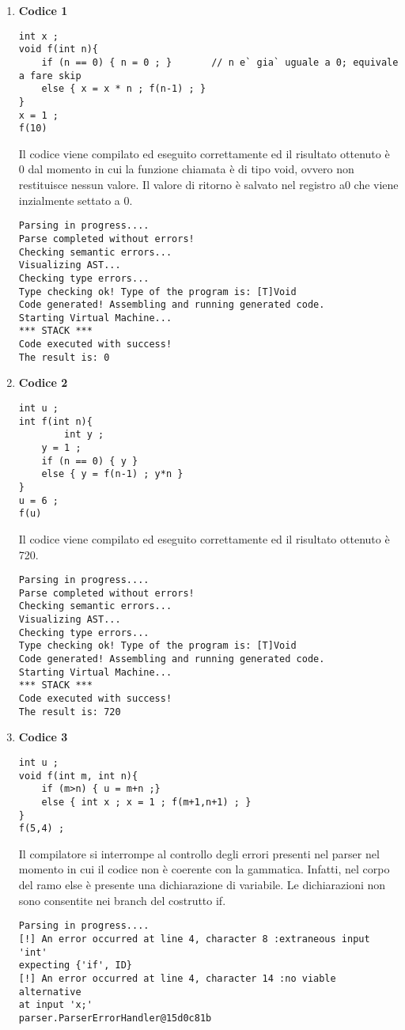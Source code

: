 \begin{enumerate}
\item \textbf{Codice 1}
\begin{verbatim}
int x ;
void f(int n){
	if (n == 0) { n = 0 ; }       // n e` gia` uguale a 0; equivale a fare skip
	else { x = x * n ; f(n-1) ; }
}
x = 1 ;
f(10)
\end{verbatim}
Il codice viene compilato ed eseguito correttamente ed il risultato ottenuto è 0 dal momento in cui la funzione chiamata è di tipo void, ovvero non restituisce nessun valore. Il valore di ritorno è salvato nel registro a0 che viene inzialmente settato a 0.

\begin{verbatim}
Parsing in progress....
Parse completed without errors!
Checking semantic errors...
Visualizing AST...
Checking type errors...
Type checking ok! Type of the program is: [T]Void
Code generated! Assembling and running generated code.
Starting Virtual Machine...
*** STACK ***
Code executed with success!
The result is: 0
\end{verbatim}

\item \textbf{Codice 2}
\begin{verbatim}
int u ;
int f(int n){
        int y ;
	y = 1 ;
	if (n == 0) { y }
	else { y = f(n-1) ; y*n }
}
u = 6 ;
f(u)
\end{verbatim}
Il codice viene compilato ed eseguito correttamente ed il risultato ottenuto è 720.

\begin{verbatim}
Parsing in progress....
Parse completed without errors!
Checking semantic errors...
Visualizing AST...
Checking type errors...
Type checking ok! Type of the program is: [T]Void
Code generated! Assembling and running generated code.
Starting Virtual Machine...
*** STACK ***
Code executed with success!
The result is: 720
\end{verbatim}

\item \textbf{Codice 3}
\begin{verbatim}
int u ;
void f(int m, int n){
	if (m>n) { u = m+n ;}
	else { int x ; x = 1 ; f(m+1,n+1) ; }
}
f(5,4) ;
\end{verbatim}
Il compilatore si interrompe al controllo degli errori presenti nel parser nel momento in cui il codice non è coerente con la gammatica. Infatti, nel corpo del ramo else è presente una dichiarazione di variabile. Le dichiarazioni non sono consentite nei branch del costrutto if.

\begin{verbatim}
Parsing in progress....
[!] An error occurred at line 4, character 8 :extraneous input 'int' 
expecting {'if', ID}
[!] An error occurred at line 4, character 14 :no viable alternative 
at input 'x;'
parser.ParserErrorHandler@15d0c81b
\end{verbatim}
\end{enumerate}